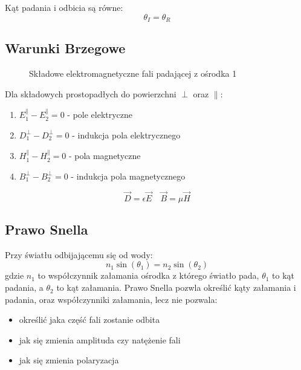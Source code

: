 \documentclass{../notatki}
\begin{document}
Kąt padania i odbicia są równe:
$$
\theta_I = \theta_R
$$

\subsection{Warunki Brzegowe}

\begin{figure}[h!]
  \centering
  \caption{Składowe elektromagnetyczne fali padającej z ośrodka 1}
\end{figure}

Dla składowych prostopadłych do powierzchni $\perp$ oraz $\parallel$:
\begin{enumerate}
  \item $E_1^\parallel - E_2^\parallel = 0$ - pole elektryczne
  \item $D_1^\perp - D_2^\perp = 0$ - indukcja pola elektrycznego
  \item $H_1^\parallel - H_2^\parallel = 0$ - pola magnetyczne
  \item $B_1^\perp - B_2^\perp = 0$ - indukcja pola magnetycznego
\end{enumerate}

$$
\vec{D} = \epsilon \vec{E} \quad \vec{B} = \mu \vec{H}
$$

\subsection{Prawo Snella}

Przy światłu odbijającemu się od wody:
$$
n_1 \sin(\theta_1) = n_2 \sin(\theta_2)
$$
gdzie $n_1$ to współczynnik załamania ośrodka z którego światło pada, $\theta_1$
to kąt padania, a $\theta_2$ to kąt załamania. Prawo Snella pozwla określić
kąty załamania i padania, oraz współczynniki załamania, lecz nie pozwala:
\begin{itemize}
  \item określić jaka część fali zostanie odbita
  \item jak się zmienia amplituda czy natężenie fali
  \item jak się zmienia polaryzacja
\end{itemize}
\end{document}
